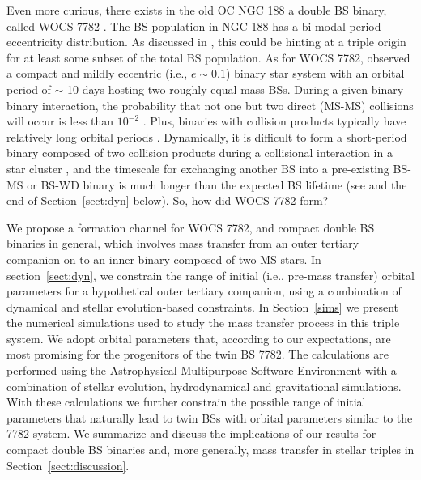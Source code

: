 \documentclass[twocolumn]{aastex62}
\providecommand{\DIFadd}[1]{{\protect\color{blue}\uwave{#1}}} %
\providecommand{\DIFaddbegin}{} %
\providecommand{\DIFaddend}{} %
\begin{document}
Even more curious, there exists in the old OC NGC 188 a double BS
binary, called WOCS 7782 \citep{2009AJ....137.3743G}.  The BS
population in NGC 188 has a bi-modal period-eccentricity distribution.
As discussed in \citet{2011MNRAS.410.2370L}, this could be hinting at
a triple origin for at least some subset of the total BS population.
As for WOCS 7782, \citet{2009Natur.462.1032M} observed a compact and
mildly eccentric (i.e., $e \sim 0.1$) binary star system with an
orbital period of $\sim$ 10 days hosting two roughly equal-mass BSs.
During a given binary-binary interaction, the probability that not one
but two direct (MS-MS) collisions will occur is less than $10^{-2}$
\citep{1989AJ.....98..217L,2011MNRAS.410.2370L,2012MNRAS.425.2369L}.
Plus, binaries with collision products typically have relatively long
orbital periods \citep{2011Sci...334.1380F}. Dynamically, it is
difficult to form a short-period binary composed of two collision
products during a collisional interaction in a star cluster
\citep{2011MNRAS.410.2370L,2011Sci...334.1380F}, and the timescale for
exchanging another BS into a pre-existing BS-MS or BS-WD binary is
much longer than the expected BS lifetime (see
\citet{2011MNRAS.410.2370L} and the end of Section~\ref{sect:dyn}
below).  So, how did WOCS 7782 form?

We propose a formation channel for WOCS 7782, and compact double BS
binaries in general, which involves mass transfer from an outer
tertiary companion on to an inner binary composed of two MS stars.  In
section~\ref{sect:dyn}, we constrain the range of initial (i.e.,
pre-mass transfer) orbital parameters for a hypothetical outer
tertiary companion, using a combination of dynamical and stellar
evolution-based constraints.  In Section~\ref{sims} we present the
numerical simulations used to study the mass transfer process in this
triple system. We adopt orbital parameters that, according to our
expectations, are most promising for the progenitors of the twin BS
7782.  The calculations are performed using the Astrophysical
Multipurpose Software Environment \cite[\texttt{AMUSE} for short,
  see][]{PortegiesZwart2013456,AMUSE} with a combination of stellar
evolution, hydrodynamical and gravitational simulations.  With these
calculations we further constrain the possible range of initial
parameters that naturally lead to twin BSs with orbital parameters
similar to the 7782 system\DIFaddbegin \DIFadd{, without exhaustively covering parameter
space}\DIFaddend .  We summarize and discuss the implications of our results for
compact double BS binaries and, more generally, mass transfer in
stellar triples in Section~\ref{sect:discussion}.
\end{document}
